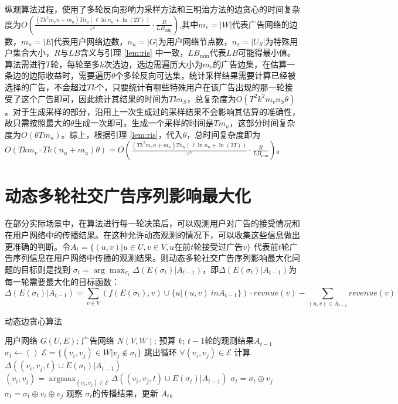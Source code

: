 纵观算法过程，使用了多轮反向影响力采样方法和三明治方法的边贪心的时间复杂度为$O\left(\frac{(Tk^2 m_v n + m_u)Tn_u(\ell \ln n_u + \ln (2T))}{\varepsilon^2}\cdot\frac{R}{LB_{\min}}\right)$,其中$m_v=|W|$代表广告网络的边数，$m_u=|E|$代表用户网络边数，$n_u=|G|$为用户网络节点数，$n_s=|U_S|$为特殊用户集合大小，$R$与$LB$含义与引理 \ref{lem:ris} 中一致，$LB_{\min}$代表$LB$可能得最小值。算法需进行$T$轮，每轮至多$k$次选边，选边需遍历大小为$m_v$的广告边集，在估算一条边的边际收益时，需要遍历$\theta$个多轮反向可达集，统计采样结果需要计算已经被选择的广告，不会超过$Tk$个，只要统计有哪些特殊用户在该广告出现的那一轮接受了这个广告即可，因此统计其结果的时间为$Tkn_S$，总复杂度为$O(T^2k^2m_vn_S\theta)$。对于生成采样的部分，沿用上一次生成过的采样结果不会影响其估算的准确性，故只需按照最大的$\theta$生成一次即可。生成一个采样的时间是$Tm_u$，这部分时间复杂度为$O(\theta Tm_u)$。综上，根据引理 \ref{lem:ris}，代入$\theta$，总时间复杂度即为$O(Tkm_v\cdot Tk(n_u+m_u)\theta) = O\left(\frac{(Tk^2 m_v n + m_u)Tn_u(\ell \ln n_u + \ln (2T))}{\varepsilon^2}\cdot\frac{R}{LB_{\min}}\right)$。


\section{动态多轮社交广告序列影响最大化}
\label{sec:ada}

在部分实际场景中，在算法进行每一轮决策后，可以观测用户对广告的接受情况和在用户网络中的传播结果。在这种允许动态观测的情况下，可以收集这些信息做出更准确的判断。令$ A_t = \{(u,v) |  u \in U, v \in V ,u \text{在前}t\text{轮接受过广告}v\} $ 代表前$t$轮广告序列信息在用户网络中传播的观测结果。则动态多轮社交广告序列影响最大化问题的目标则是找到 $\sigma_t = \arg \max_{\sigma_t} \Delta(E(\sigma_t) | A_{t-1})$，即$\Delta(E(\sigma_t) | A_{t-1})$为每一轮需要最大化的目标函数：
\begin{equation}
    \Delta(E(\sigma_t) | A_{t-1}) = \sum_{v \in V} ( f(E(\sigma_t), v) \cup \{u | (u,v) \ in A_{t-1}\}) \cdot revnue(v) - \sum_{(u,v) \in A_{t-1}} revenue(v) 
\end{equation}


\begin{algorithm}[H]
    \caption{动态边贪心算法\label{alg:ada}}
    \begin{algorithmic}[1]
        \REQUIRE 用户网络 $G(U,E)$; 广告网络 $N(V,W)$; 预算 $k$; $t-1$轮的观测结果$A_{t - 1}$
        \STATE \(\sigma_t \gets ( )\)
            \STATE \(\mathcal{E} = \{(v_i,v_j) \in W | v_j \notin \sigma_t \}\)
                \STATE 跳出循环
            \ENDIF
            \STATE \(\forall (v_i,v_j) \in \mathcal{E}\) 计算 $\Delta({(v_i,v_j,t)} \cup E(\sigma_t)|A_{t-1})$
            \STATE \((v_i,v_j) = \mathop{\arg\max}_{(v_i,v_j) \in \mathcal{E}}\Delta({(v_i,v_j,t)} \cup E(\sigma_t)|A_{t-1}) \)
                \STATE \(\sigma_t = \sigma_t \oplus v_j\)
            \ELSE
                \STATE \(\sigma_t = \sigma_t \oplus v_i \oplus v_j\) 
            \ENDIF
        \ENDWHILE
        \STATE 观察 $\sigma_t$的传播结果，更新 $A_t$。
    \end{algorithmic}
\end{algorithm}

